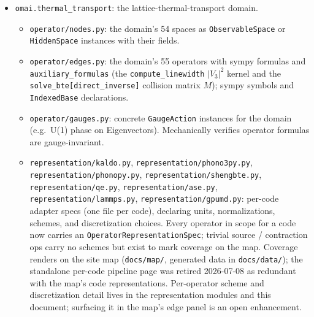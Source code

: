 \documentclass[11pt,a4paper]{article}
\begin{document}
\begin{itemize}[leftmargin=2em, itemsep=0.3em]
\begin{itemize}[leftmargin=1.2em]
            (aliased as \texttt{compare}) returns a
            \texttt{RepresentationComparisonResult} with the five-status
            verdict and residuals.
    \end{itemize}
    Code-agnostic.
  \item \texttt{omai.thermal\_transport}: the lattice-thermal-transport domain.
    \begin{itemize}[leftmargin=1.2em]
      \item \texttt{operator/nodes.py}: the domain's 54 spaces as \texttt{ObservableSpace} or
            \texttt{HiddenSpace} instances with their fields.
      \item \texttt{operator/edges.py}: the domain's 55 operators with sympy formulas
            and \texttt{auxiliary\_formulas} (the \texttt{compute\_linewidth}
            $|V_3|^2$ kernel and the \texttt{solve\_bte[direct\_inverse]}
            collision matrix $M$); sympy symbols and \texttt{IndexedBase}
            declarations.
      \item \texttt{operator/gauges.py}: concrete \texttt{GaugeAction}
            instances for the domain (e.g.\ U(1) phase on Eigenvectors).
            Mechanically verifies operator formulas are gauge-invariant.
      \item \texttt{representation/kaldo.py},
            \texttt{representation/phono3py.py},
            \texttt{representation/phonopy.py},
            \texttt{representation/shengbte.py},
            \texttt{representation/qe.py},
            \texttt{representation/ase.py},
            \texttt{representation/lammps.py},
            \texttt{representation/gpumd.py}: per-code adapter specs
            (one file per code), declaring units, normalizations, schemes,
            and discretization choices. Every operator in scope for a code
            now carries an \texttt{OperatorRepresentationSpec}; trivial source /
            contraction ops carry no schemes but exist to mark coverage
            on the map. Coverage renders on the site map (\texttt{docs/map/},
            generated data in \texttt{docs/data/}); the standalone per-code
            pipeline page was retired 2026-07-08 as redundant with the map's
            code representations. Per-operator scheme and discretization detail lives in
            the representation modules and this document; surfacing it in the
            map's edge panel is an open enhancement.
    \end{itemize}
\end{itemize}
\end{document}

